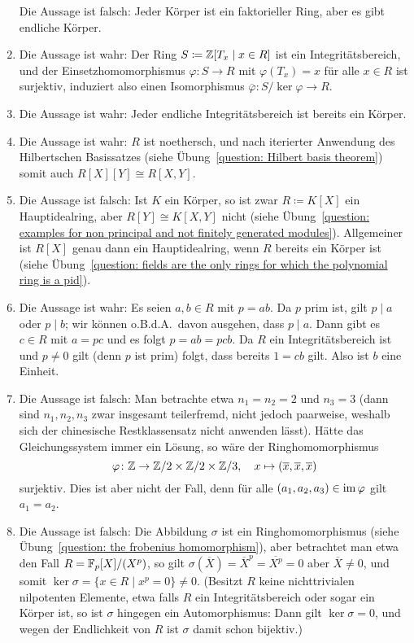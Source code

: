 \begin{solution}
\begin{enumerate}
      Die Aussage ist falsch:
      Jeder Körper ist ein faktorieller Ring, aber es gibt endliche Körper.
    \item
      Die Aussage ist wahr:
      Der Ring $S \coloneqq \mathbb{Z}[T_x \mid x \in R]$ ist ein Integritätsbereich, und der Einsetzhomomorphismus $\varphi \colon S \to R$ mit $\varphi(T_x) = x$ für alle $x \in R$ ist surjektiv, induziert also einen Isomorphismus $\overline{\varphi} \colon S / \ker \varphi \to R$.
    \item
      Die Aussage ist wahr:
      Jeder endliche Integritätsbereich ist bereits ein Körper.
    \item
      Die Aussage ist wahr:
      $R$ ist noethersch, und nach iterierter Anwendung des Hilbertschen Basissatzes (siehe Übung~\ref{question: Hilbert basis theorem}) somit auch $R[X][Y] \cong R[X,Y]$.
    \item
      Die Aussage ist falsch:
      Ist $K$ ein Körper, so ist zwar $R \coloneqq K[X]$ ein Hauptidealring, aber $R[Y] \cong K[X,Y]$ nicht (siehe Übung~\ref{question: examples for non principal and not finitely generated modules}).
      Allgemeiner ist $R[X]$ genau dann ein Hauptidealring, wenn $R$ bereits ein Körper ist (siehe Übung~\ref{question: fields are the only rings for which the polynomial ring is a pid}).
    \item
      Die Aussage ist wahr:
      Es seien $a, b \in R$ mit $p = ab$.
      Da $p$ prim ist, gilt $p \mid a$ oder $p \mid b$;
      wir können o.B.d.A.\ davon ausgehen, dass $p \mid a$.
      Dann gibt es $c \in R$ mit $a = pc$ und es folgt $p = ab = pcb$.
      Da $R$ ein Integritätsbereich ist und $p \neq 0$ gilt (denn $p$ ist prim) folgt, dass bereits $1 = cb$ gilt.
      Also ist $b$ eine Einheit.
    \item
      Die Aussage ist falsch:
      Man betrachte etwa $n_1 = n_2 = 2$ und $n_3 = 3$ (dann sind $n_1, n_2, n_3$ zwar insgesamt teilerfremd, nicht jedoch paarweise, weshalb sich der chinesische Restklassensatz nicht anwenden lässt).
      Hätte das Gleichungssystem immer ein Lösung, so wäre der Ringhomomorphismus
      \[
                \varphi
        \colon  \mathbb{Z} \to \mathbb{Z}/2 \times \mathbb{Z}/2 \times \mathbb{Z}/3,
        \quad   x
        \mapsto (\overline{x}, \overline{x}, \overline{x})
      \]
      surjektiv.
      Dies ist aber nicht der Fall, denn für alle $(a_1, a_2, a_3) \in \operatorname{im} \varphi$ gilt $a_1 = a_2$.
    \item
      Die Aussage ist falsch:
      Die Abbildung $\sigma$ ist ein Ringhomomorphismus (siehe Übung~\ref{question: the frobenius homomorphism}), aber betrachtet man etwa den Fall $R = \mathbb{F}_p[X]/(X^p)$, so gilt $\sigma(\overline{X}) = \overline{X}^p = \overline{X^p} = 0$ aber $\overline{X} \neq 0$, und somit $\ker \sigma = \{x \in R \mid x^p = 0\} \neq 0$.
      (Besitzt $R$ keine nichttrivialen nilpotenten Elemente, etwa falls $R$ ein Integritätsbereich oder sogar ein Körper ist, so ist $\sigma$ hingegen ein Automorphismus:
      Dann gilt $\ker \sigma = 0$, und wegen der Endlichkeit von $R$ ist $\sigma$ damit schon bijektiv.)
  \end{enumerate}
\end{solution}


